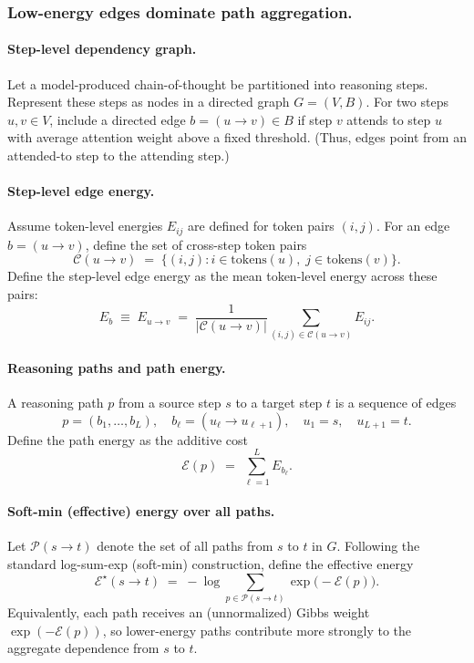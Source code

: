 \subsubsection{Low-energy edges dominate path aggregation.}
\paragraph{Step-level dependency graph.}
Let a model-produced chain-of-thought be partitioned into reasoning steps.
Represent these steps as nodes in a directed graph \(G=(V,B)\).
For two steps \(u,v\in V\), include a directed edge \(b=(u\to v)\in B\) if step \(v\) attends to step \(u\) with average attention weight above a fixed threshold.
(Thus, edges point from an attended-to step to the attending step.)

\paragraph{Step-level edge energy.}
Assume token-level energies \(E_{ij}\) are defined for token pairs \((i,j)\).
For an edge \(b=(u\to v)\), define the set of cross-step token pairs
\begin{equation}
\mathcal{C}(u\to v) \;=\; \{(i,j): i\in \text{tokens}(u),\; j\in \text{tokens}(v)\}.
\end{equation}
Define the step-level edge energy as the mean token-level energy across these pairs:
\begin{equation}
E_b \;\equiv\; E_{u\to v}
\;=\;
\frac{1}{|\mathcal{C}(u\to v)|}\sum_{(i,j)\in \mathcal{C}(u\to v)} E_{ij}.
\end{equation}

\paragraph{Reasoning paths and path energy.}
A reasoning path \(p\) from a source step \(s\) to a target step \(t\) is a sequence of edges
\begin{equation}
p=(b_1,\dots,b_L),\quad b_\ell=(u_\ell\to u_{\ell+1}),\quad u_1=s,\quad u_{L+1}=t.
\end{equation}
Define the path energy as the additive cost
\begin{equation}
\mathcal{E}(p) \;=\; \sum_{\ell=1}^{L} E_{b_\ell}.
\end{equation}

\paragraph{Soft-min (effective) energy over all paths.}
Let \(\mathcal{P}(s\to t)\) denote the set of all paths from \(s\) to \(t\) in \(G\).
Following the standard log-sum-exp (soft-min) construction, define the effective energy
\begin{equation}
\mathcal{E}^\star(s\to t)
\;=\;
-\log \sum_{p\in\mathcal{P}(s\to t)} \exp \bigl(-\mathcal{E}(p)\bigr).
\end{equation}
Equivalently, each path receives an (unnormalized) Gibbs weight \(\exp(-\mathcal{E}(p))\), so lower-energy paths contribute more strongly to the aggregate dependence from \(s\) to \(t\).

